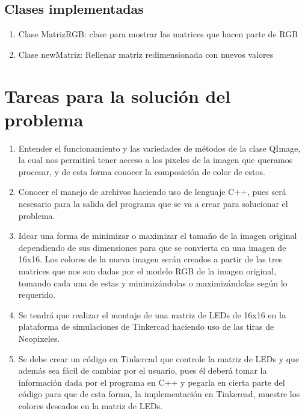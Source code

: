 \documentclass{article}
\begin{document}
\subsection{Clases implementadas}
\begin{enumerate}
\item Clase MatrizRGB: clase para mostrar las matrices que hacen parte de RGB
\item Clase newMatriz: Rellenar matriz redimensionada con nuevos valores


\end{enumerate}

\section{Tareas para la solución del problema} \label{tareas}
\begin{enumerate}
\item Entender el funcionamiento y las variedades de métodos de la clase QImage, la cual nos permitirá tener acceso a los pixeles de la imagen que queramos procesar, y de esta forma conocer la composición de color de estos.
\item Conocer el manejo de archivos haciendo uso de lenguaje C++, pues será nesesario para la salida del programa que se va a crear para solucionar el problema.
\item Idear una forma de minimizar o maximizar el tamaño de la imagen original dependiendo de sus dimensiones para que se convierta en una imagen de 16x16. Los colores de la nueva imagen serán creados a partir de las tres matrices que nos son dadas por el modelo RGB de la imagen original, tomando cada una de estas y minimizándolas o maximizándolas según lo requerido.
\item Se tendrá que realizar el montaje de una matriz de LEDs de 16x16 en la plataforma de simulaciones de Tinkercad haciendo uso de las tiras de Neopixeles.
\item Se debe crear un código en Tinkercad que controle la matriz de LEDs y que además sea fácil de cambiar por el usuario, pues él deberá tomar la información dada por el programa en C++ y pegarla en cierta parte del código para que de esta forma, la implementación en Tinkercad, muestre los colores deseados en la matriz de LEDs.


\end{enumerate}

\newpage
\end{document}
